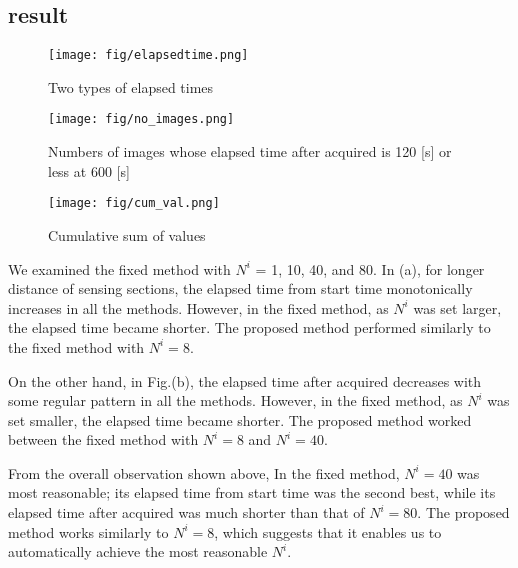 \documentclass{ieeeaccess}
\begin{document}
\subsection{result}

\begin{figure}[t]
\begin{center}
\texttt{[image: fig/elapsedtime.png]}
\caption{Two types of elapsed times}
\label{elapsed}
\end{center}
\end{figure}

\begin{figure*}[t]
\begin{center}
\texttt{[image: fig/no\_images.png]}
\caption{Numbers of images whose elapsed time after acquired is 120 [s] or less at 600 [s]}
\label{totalnumber}
\end{center}
\end{figure*}

\begin{figure*}[t]
\begin{center}
\texttt{[image: fig/cum\_val.png]}
\caption{Cumulative sum of values}
\label{totalvalue}
\end{center}
\end{figure*}

We examined the fixed method with $N^i$ = 1, 10, 40, and 80.
In (a), for longer distance of sensing sections, the elapsed time from start time monotonically increases in all the methods.
However, in the fixed method, as $N^i$ was set larger, the elapsed time became shorter.
The proposed method performed similarly to the fixed method with $N^i=8$.

On the other hand, in Fig.(b), the elapsed time after acquired decreases with some regular pattern in all the methods.
However, in the fixed method, as $N^i$ was set smaller, the elapsed time became shorter.
The proposed method worked between the fixed method with $N^i=8$ and $N^i=40$.

From the overall observation shown above, In the fixed method, $N^i=40$ was most reasonable; its elapsed time from start time was the second best, while its elapsed time after acquired was much shorter than that of $N^i=80$.
The proposed method works similarly to $N^i=8$, which suggests that it enables us to automatically achieve the most reasonable $N^i$.
\end{document}
